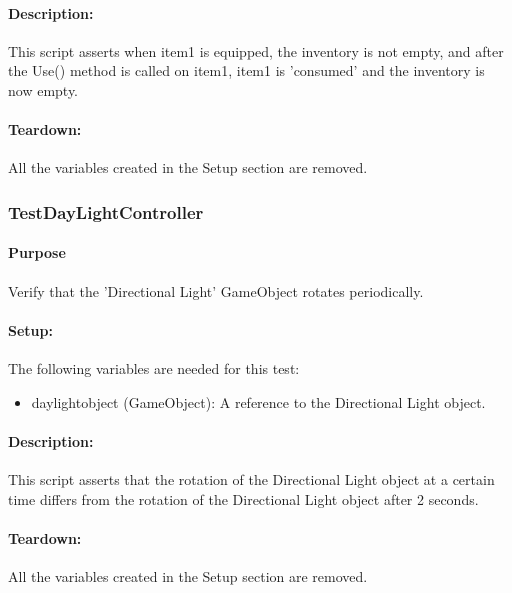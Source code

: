 \documentclass[12pt, titlepage]{article}
\begin{document}
\paragraph{Description: }
This script asserts when item1 is equipped, the inventory is not empty, and after the Use() method is called on item1, item1 is 'consumed' and the inventory is now empty.
\paragraph{Teardown: } All the variables created in the Setup section are removed.
\subsubsection{Test\textunderscore DayLightController}


\paragraph{Purpose} Verify that the 'Directional Light' GameObject rotates periodically.

\paragraph{Setup: } The following variables are needed for this test:
\begin{itemize}
	\item daylightobject (GameObject): A reference to the Directional Light object.
	
\end{itemize}
\paragraph{Description: }
This script asserts that the rotation of the Directional Light object at a certain time differs from the rotation of the Directional Light object after 2 seconds.

\paragraph{Teardown: } All the variables created in the Setup section are removed.
\end{document}
